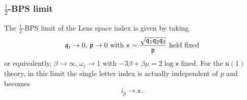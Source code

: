 \documentclass[main.tex]{subfiles}
\begin{document}
\subsubsection{$\frac{1}{2}$-BPS limit}
The $\frac{1}{2}$-BPS limit of the Lens space index is given by taking
\begin{equation}
\text{$\mathfrak{q}_i\to0$, $\mathfrak{p}\to0$ with $\mathsf{x}=\frac{\sqrt{\mathfrak{q}_1\mathfrak{q}_2\mathfrak{q}_3}}{\mathfrak{p}}$ held fixed}
\end{equation}
or equivalently, $\beta\to\infty, \omega_i\to1$ with $-3\beta+\beta\mu=2\log\mathsf{x}$ fixed. For the $\mathfrak{u}(1)$ theory, in this limit the single letter index is actually independent of $p$ and becomes
\begin{equation}
i_p\to\mathsf{x}\,.
\end{equation}
\end{document}
